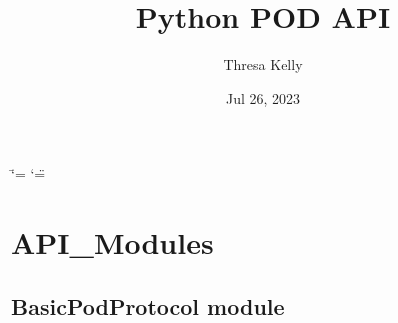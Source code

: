 \documentclass[letterpaper,10pt,english]{sphinxmanual}
\title{Python POD API}
\date{Jul 26, 2023}
\author{Thresa Kelly}
\begin{document}
\ifdefined\shorthandoff
  \ifnum\catcode`\=\string=\active\shorthandoff{=}\fi
  \ifnum\catcode`\"=\active{}\fi
\fi

\pagestyle{empty}
\sphinxmaketitle
\pagestyle{plain}
\sphinxtableofcontents
\pagestyle{normal}
\label{\detokenize{index::doc}}


\sphinxstepscope


\chapter{API\_Modules}
\label{\detokenize{modules:api-modules}}\label{\detokenize{modules::doc}}
\sphinxstepscope


\section{BasicPodProtocol module}
\label{\detokenize{BasicPodProtocol:module-BasicPodProtocol}}\label{\detokenize{BasicPodProtocol:basicpodprotocol-module}}\label{\detokenize{BasicPodProtocol::doc}}
\end{document}
